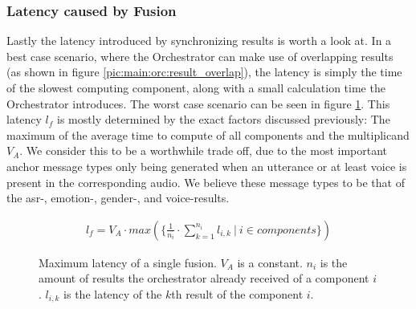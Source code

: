 \subsubsection{Latency caused by Fusion}
Lastly the latency introduced by synchronizing results is worth a look at.
In a best case scenario, where the Orchestrator can make use of overlapping results (as shown in figure \ref{pic:main:orc:result_overlap}), the latency is simply the time of the slowest computing component, along with a small calculation time the Orchestrator introduces.
The worst case scenario can be seen in figure \ref{main:orc:latency:formula}.
This latency $l_f$ is mostly determined by the exact factors discussed previously: The maximum of the average time to compute of all components and the multiplicand $V_A$. 
We consider this to be a worthwhile trade off, due to the most important anchor message types only being generated when an utterance or at least voice is present in the corresponding audio.
We believe these message types to be that of the \gls{asr}-, emotion-, gender-, and voice-results.

\begin{figure}
	\begin{align*}
	l_{f} = V_A \cdot max(\{\frac{1}{n_i} \cdot \sum_{k=1}^{n_i} l_{i,k}\ | \ i \in components\})
	\end{align*}
	\caption{Maximum latency of a single fusion.
		$V_A$ is a constant.
		$n_i$ is the amount of results the orchestrator already received of a component $i$.
		$l_{i,k}$ is the latency of the $k$th result of the component $i$.}
	\label{main:orc:latency:formula}
\end{figure}

